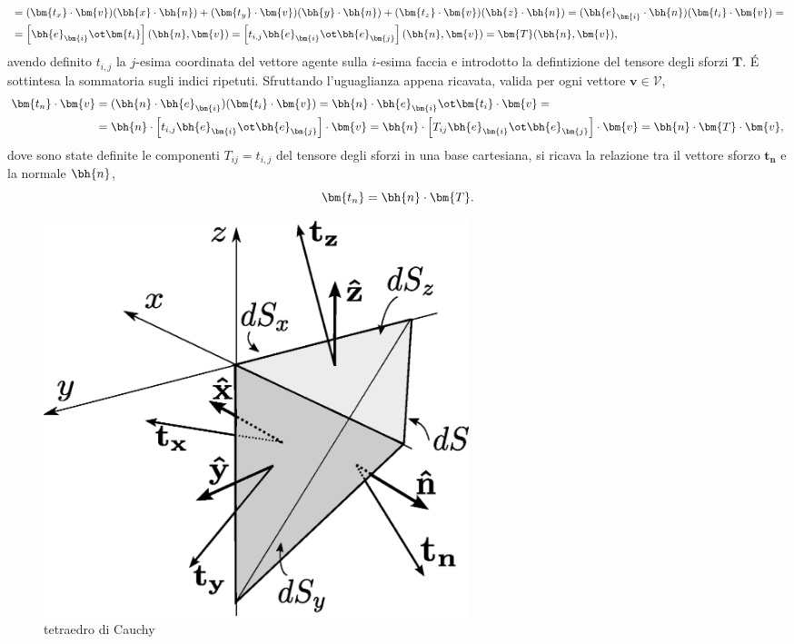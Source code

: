 \begin{example}
\begin{equation}
\begin{aligned}
& = (\bm{t_x}\cdot \bm{v}) (\bh{x} \cdot \bh{n}) +
    (\bm{t_y}\cdot \bm{v}) (\bh{y} \cdot \bh{n}) +
    (\bm{t_z}\cdot \bm{v}) (\bh{z} \cdot \bh{n}) = (\bh{e}_{\bm{i}} \cdot \bh{n}) (\bm{t_i}\cdot \bm{v}) = \\
& = \left[\bh{e}_{\bm{i}} \ot \bm{t_i}\right] (\bh{n},\bm{v}) = 
 \left[t_{i,j} \bh{e}_{\bm{i}} \ot \bh{e}_{\bm{j}} \right] (\bh{n},\bm{v}) = \bm{T} (\bh{n},\bm{v}) ,
\end{aligned}
\end{equation}
avendo definito $t_{i,j}$ la $j$-esima coordinata del vettore agente sulla $i$-esima faccia e introdotto la defintizione del tensore degli sforzi $\bm{T}$. \'E sottintesa la sommatoria sugli indici ripetuti. Sfruttando l'uguaglianza appena ricavata,  valida per ogni vettore $\bm{v} \in \mathcal{V}$,
\begin{equation}
\begin{aligned}
  \bm{t_n} \cdot \bm{v} & = (\bh{n} \cdot \bh{e}_{\bm{i}}) (\bm{t_i}\cdot \bm{v})
   = \bh{n} \cdot \bh{e}_{\bm{i}} \ot \bm{t_i} \cdot \bm{v} = \\
 & = \bh{n} \cdot \left[t_{i,j} \bh{e}_{\bm{i}} \ot \bh{e}_{\bm{j}} \right] \cdot \bm{v}
   = \bh{n} \cdot \left[T_{ij} \bh{e}_{\bm{i}} \ot \bh{e}_{\bm{j}} \right] \cdot \bm{v}
   = \bh{n} \cdot \bm{T} \cdot \bm{v} ,
\end{aligned}
\end{equation}
 dove sono state definite le componenti $T_{ij} = t_{i,j}$ del tensore degli sforzi in una base cartesiana, si ricava la relazione tra il vettore sforzo $\bm{t_n}$ e la normale $\bh{n}$,
 \begin{equation}\label{eqn:tensor:stressTensor}
  \bm{t_n} = \bh{n} \cdot \bm{T} .
 \end{equation}
\end{example}

\begin{figure}
\centering
 \includegraphics[width=0.60\textwidth]{./fig/cauchy.eps}
\caption{tetraedro di Cauchy}\label{fig:tetraedroCauchy}
\end{figure}

